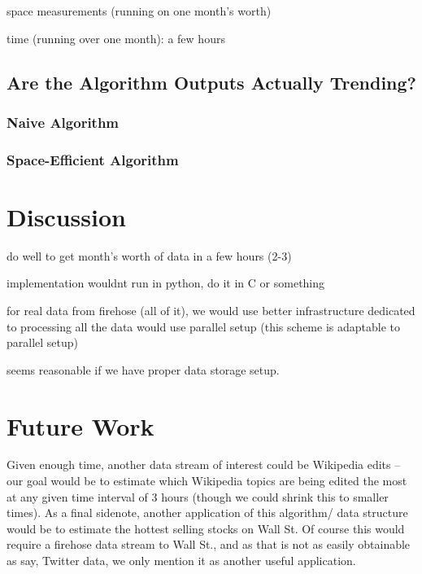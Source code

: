 \documentclass[twoside]{article}
\begin{document}
space measurements (running on one month's worth)

time (running over one month): a few hours

\subsection{Are the Algorithm Outputs Actually Trending?}

\subsubsection{Naive Algorithm}

\subsubsection{Space-Efficient Algorithm}



\section{Discussion}

do well to get month's worth of data in a few hours (2-3)

implementation wouldnt run in python, do it in C or something

for real data from firehose (all of it), we would use 
better infrastructure dedicated to processing all the data
would use parallel setup (this scheme is adaptable to parallel
setup)

seems reasonable if we have proper data storage setup.


\section{Future Work} \label{sec:Future Work}

Given enough time, another data stream of interest could be Wikipedia edits -- our goal would be to estimate which Wikipedia topics are being edited the most at any given time interval of 3 hours (though we could shrink this to smaller times). As a final sidenote, another application of this algorithm/ data structure would be to estimate the hottest selling stocks on Wall St. Of course this would require a firehose data stream to Wall St., and as that is not as easily obtainable as say, Twitter data, we only mention it as another useful application.
\end{document}
